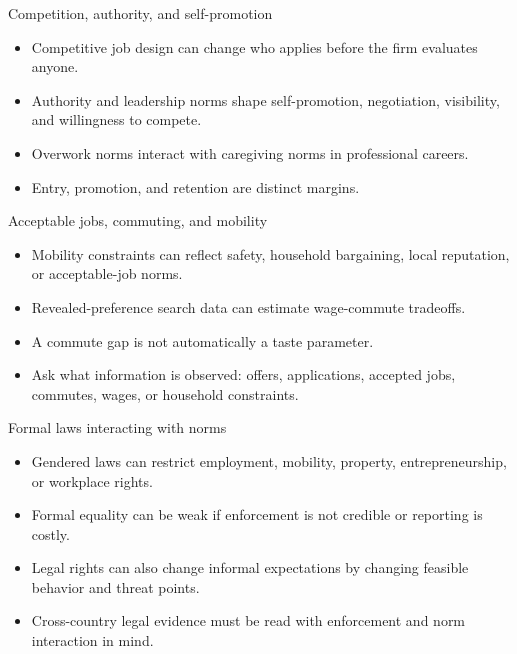 \documentclass[aspectratio=169,11pt]{beamer}
\begin{document}
\begin{frame}{Competition, authority, and self-promotion}
\begin{itemize}
    \item Competitive job design can change who applies before the firm evaluates anyone.
    \item Authority and leadership norms shape self-promotion, negotiation, visibility, and willingness to compete.
    \item Overwork norms interact with caregiving norms in professional careers.
    \item Entry, promotion, and retention are distinct margins.
\end{itemize}
\end{frame}

\begin{frame}{Acceptable jobs, commuting, and mobility}
\begin{itemize}
    \item Mobility constraints can reflect safety, household bargaining, local reputation, or acceptable-job norms.
    \item Revealed-preference search data can estimate wage-commute tradeoffs.
    \item A commute gap is not automatically a taste parameter.
    \item Ask what information is observed: offers, applications, accepted jobs, commutes, wages, or household constraints.
\end{itemize}
\end{frame}

\begin{frame}{Formal laws interacting with norms}
\begin{itemize}
    \item Gendered laws can restrict employment, mobility, property, entrepreneurship, or workplace rights.
    \item Formal equality can be weak if enforcement is not credible or reporting is costly.
    \item Legal rights can also change informal expectations by changing feasible behavior and threat points.
    \item Cross-country legal evidence must be read with enforcement and norm interaction in mind.
\end{itemize}
\end{frame}
\end{document}
